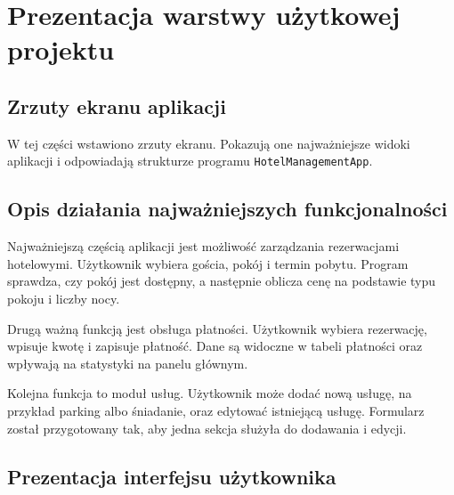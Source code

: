 \chapter{Prezentacja warstwy użytkowej projektu}
\section{Zrzuty ekranu aplikacji}

W tej części wstawiono zrzuty ekranu. Pokazują one najważniejsze widoki aplikacji i odpowiadają strukturze programu \texttt{HotelManagementApp}.









\section{Opis działania najważniejszych funkcjonalności}

Najważniejszą częścią aplikacji jest możliwość zarządzania rezerwacjami hotelowymi. Użytkownik wybiera gościa, pokój i termin pobytu. Program sprawdza, czy pokój jest dostępny, a następnie oblicza cenę na podstawie typu pokoju i liczby nocy.

Drugą ważną funkcją jest obsługa płatności. Użytkownik wybiera rezerwację, wpisuje kwotę i zapisuje płatność. Dane są widoczne w tabeli płatności oraz wpływają na statystyki na panelu głównym.

Kolejna funkcja to moduł usług. Użytkownik może dodać nową usługę, na przykład parking albo śniadanie, oraz edytować istniejącą usługę. Formularz został przygotowany tak, aby jedna sekcja służyła do dodawania i edycji.

\section{Prezentacja interfejsu użytkownika}


